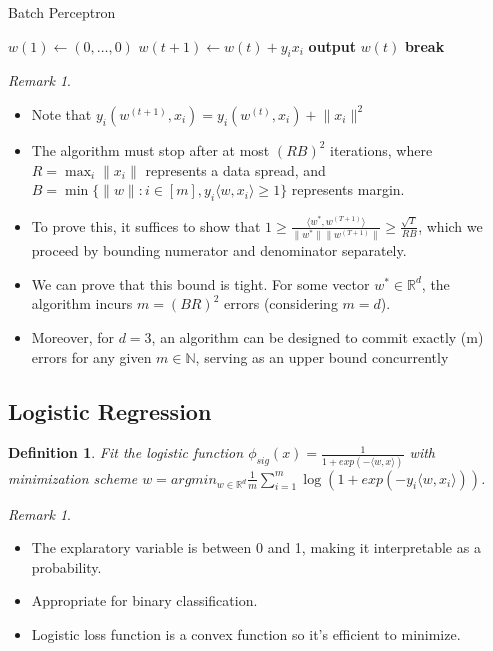 \documentclass{article}
\newtheorem{definition}{Definition}
\theoremstyle{remark}
\newtheorem{remark}[example]{Remark}
\begin{document}
\begin{algorithm}[H]
        \caption{Batch Perceptron}
        \begin{algorithmic}[1]
            \State $w(1) \gets (0, \ldots, 0)$
                    \State $w(t+1) \gets w(t) + y_i x_i$
                \Else
                    \State \textbf{output} $w(t)$
                    \State \textbf{break}
                \EndIf
            \EndFor
        \EndFunction
        \end{algorithmic}
    \end{algorithm}

        \begin{remark}
        \begin{itemize}
        \item Note that $y_i(w^{(t+1)}, x_i)=y_i(w^{(t)}, x_i)+\lVert x_i\rVert^2$
        \item The algorithm must stop after at most $(RB)^2$ iterations, where $R=\max_i\lVert x_i\rVert$ represents a data spread, and $B=\min\{\lVert w\rVert: i\in[m], y_i\langle w,x_i\rangle\geq 1\}$ represents 
        margin.
        \item To prove this, it suffices to show that $1\geq\frac{\langle w^*, w^{(T+1)}\rangle}{\lVert w^*\rVert\lVert w^{(T+1)}\rVert}\geq\frac{\sqrt T}{RB}$, which we proceed by bounding numerator and denominator separately.
        \item We can prove that this bound is tight. For some vector $w^* \in \mathbb{R}^d$, the algorithm incurs $m = (BR)^2$ errors (considering $m = d$).
        \item Moreover, for $d = 3$, an algorithm can be designed to commit exactly (m) errors for any given $m \in \mathbb{N}$, serving as an upper bound concurrently        \end{itemize}
        \end{remark}

        \subsection*{Logistic Regression}
        \begin{definition}
        Fit the logistic function $\phi_{sig}(x)=\frac 1{1+exp(-\langle w,x\rangle)}$ with minimization scheme $w=argmin_{w\in\mathbb{R}^d} \frac 1m\sum^m_{i=1} \log(1+exp(-y_i\langle w,x_i\rangle))$.
        \end{definition}
        \begin{remark}
        \begin{itemize}
        \item The explaratory variable is between 0 and 1, making it interpretable as a probability.
        \item Appropriate for binary classification.
        \item Logistic loss function is a convex function so it's efficient to minimize.
        \end{itemize}
        \end{remark}
\end{document}
